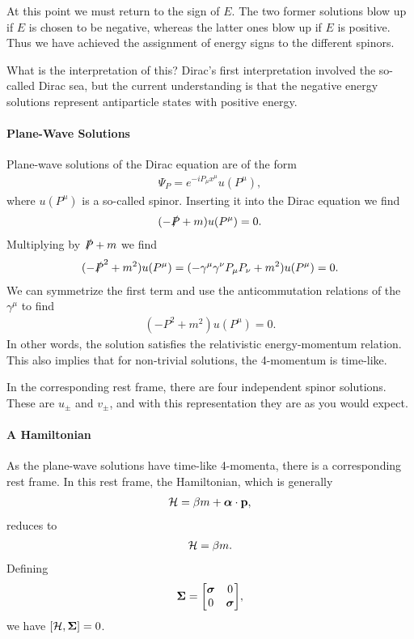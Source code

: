 At this point we must return to the sign of $E$. The two former solutions blow up if $E$ is chosen to be negative, whereas the latter ones blow up if $E$ is positive. Thus we have achieved the assignment of energy signs to the different spinors.

What is the interpretation of this? Dirac's first interpretation involved the so-called Dirac sea, but the current understanding is that the negative energy solutions represent antiparticle states with positive energy.

\paragraph{Plane-Wave Solutions}
Plane-wave solutions of the Dirac equation are of the form
\begin{align*}
	\Psi_{P} = e^{-iP_{\mu}x^{\mu}}u(P^{\mu}),
\end{align*}
where $u(P^{\mu})$ is a so-called spinor. Inserting it into the Dirac equation we find
\begin{align*}
	(-\slashed{P} + m)u(P^{\mu}) = 0.
\end{align*}
Multiplying by $\slashed{P} + m$ we find
\begin{align*}
	(-\slashed{P}^{2} + m^{2})u(P^{\mu}) = (-\gamma^{\mu}\gamma^{\nu}P_{\mu}P_{\nu} + m^{2})u(P^{\mu}) = 0.
\end{align*}
We can symmetrize the first term and use the anticommutation relations of the $\gamma^{\mu}$ to find
\begin{align*}
	(-P^{2} + m^{2})u(P^{\mu}) = 0.
\end{align*}
In other words, the solution satisfies the relativistic energy-momentum relation. This also implies that for non-trivial solutions, the 4-momentum is time-like.

In the corresponding rest frame, there are four independent spinor solutions. These are $u_{\pm}$ and $v_{\pm}$, and with this representation they are as you would expect.

\paragraph{A Hamiltonian}
As the plane-wave solutions have time-like 4-momenta, there is a corresponding rest frame. In this rest frame, the Hamiltonian, which is generally
\begin{align*}
	\mathcal{H} = \beta m + \vb*{\alpha}\cdot\vb{p},
\end{align*}
reduces to
\begin{align*}
	\mathcal{H} = \beta m.
\end{align*}
Defining
\begin{align*}
	\vb*{\Sigma} =
	\mqty[
		\vb*{\sigma} & 0 \\
		0            & \vb*{\sigma}
	],
\end{align*}
we have $\comm{\ham}{\vb*{\Sigma}} = 0$.

